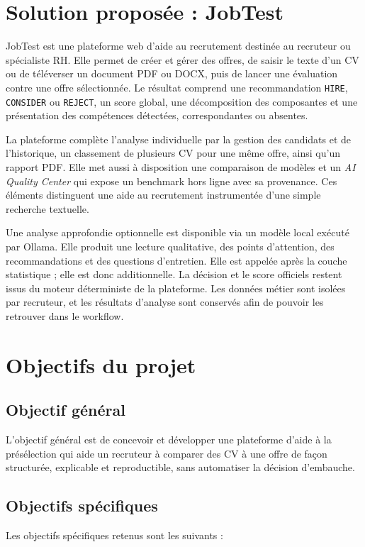 \section{Solution proposée : JobTest}
JobTest est une plateforme web d'aide au recrutement destinée au recruteur ou spécialiste RH. Elle permet de créer et gérer des offres, de saisir le texte d'un CV ou de téléverser un document PDF ou DOCX, puis de lancer une évaluation contre une offre sélectionnée. Le résultat comprend une recommandation \texttt{HIRE}, \texttt{CONSIDER} ou \texttt{REJECT}, un score global, une décomposition des composantes et une présentation des compétences détectées, correspondantes ou absentes.

La plateforme complète l'analyse individuelle par la gestion des candidats et de l'historique, un classement de plusieurs CV pour une même offre, ainsi qu'un rapport PDF. Elle met aussi à disposition une comparaison de modèles et un \textit{AI Quality Center} qui expose un benchmark hors ligne avec sa provenance. Ces éléments distinguent une aide au recrutement instrumentée d'une simple recherche textuelle.

Une analyse approfondie optionnelle est disponible via un modèle local exécuté par Ollama. Elle produit une lecture qualitative, des points d'attention, des recommandations et des questions d'entretien. Elle est appelée après la couche statistique ; elle est donc additionnelle. La décision et le score officiels restent issus du moteur déterministe de la plateforme. Les données métier sont isolées par recruteur, et les résultats d'analyse sont conservés afin de pouvoir les retrouver dans le workflow.

\section{Objectifs du projet}

\subsection{Objectif général}
L'objectif général est de concevoir et développer une plateforme d'aide à la présélection qui aide un recruteur à comparer des CV à une offre de façon structurée, explicable et reproductible, sans automatiser la décision d'embauche.

\subsection{Objectifs spécifiques}
Les objectifs spécifiques retenus sont les suivants :

